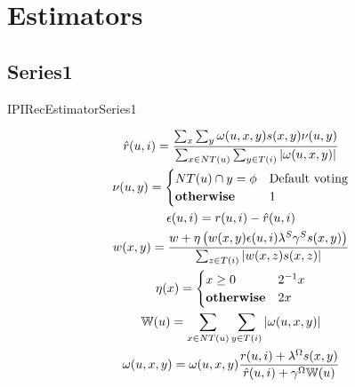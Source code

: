 \section{Estimators}

\subsection{Series1}
\begin{algorithm}
\caption{IPIRecEstimatorSeries1}
\begin{algorithmic}
        \EndFor{}
    \EndFor{}
    \EndFor{}
\EndFunction{}
    \EndFor{}
\EndFunction{}
\end{algorithmic}
\end{algorithm}

\begin{gather}
    \hat{r}(u,i) = \frac{\sum_{x}\sum_{y} \omega(u,x,y) s(x,y) \nu(u,y)}{\sum_{x \in NT(u)}\sum_{y \in T(i)} |\omega(u,x,y)|} \label{eq:s1_estimate} \\
    \nu(u,y) = \begin{cases}
    NT(u) \cap y = \phi & \text{Default voting} \\
    \text{\textbf{otherwise}} & 1 
    \end{cases} \nonumber \\
    \epsilon(u,i) = r(u,i) - \hat{r}(u,i) \nonumber \\
    w(x,y) = \frac{w + \eta \left(w(x,y) \epsilon(u,i) \lambda^{S} \gamma^{S} s(x,y)\right)}{\sum_{z \in T(i)} |w(x,z) s(x,z)|} \label{eq:s1_feeback} \\
    \eta (x) = \begin{cases}
    x \geq 0 & 2^{-1}x \\
    \text{\textbf{otherwise}} & 2x
    \end{cases} \nonumber \\
    \mathbb{W}(u) = \sum_{x \in NT(u)}\sum_{y \in T(i)} |\omega(u,x,y)| \nonumber \\
    \omega(u,x,y) = \omega(u,x,y) \frac{r(u,i) + \lambda^{\Omega}s(x,y)}{\hat{r}(u,i) + \gamma^{\Omega} \mathbb{W}(u)} \label{eq:s1_personalization}
\end{gather}
\clearpage \newpage

